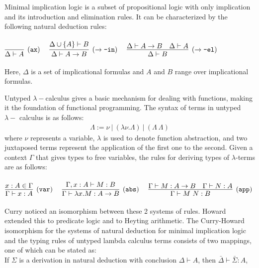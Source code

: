 \documentclass{article}
\begin{document}
	Minimal implication logic is a subset
	of propositional logic with only 
	implication and its introduction 
	and elimination rules. It can be 
	characterized by the following 
	natural deduction rules:\\ \\
	\begin{math}
		\infer[(\texttt{ax})]{\Delta \vdash A}{}
		\ \ \ \ 
		\infer[(\to\texttt{-in})]{\Delta \vdash A \to B}
		{\Delta \cup \{A\} \vdash B}
		\ \ \ \ 
		\infer[(\to\texttt{-el})]{\Delta \vdash B}
		{\Delta \vdash A \to B & \Delta \vdash A}
	\end{math} 
	\\ \\
	Here, $\Delta$ is a set of implicational 
	formulas and $A$ and $B$ range over 
	implicational formulas. 
	
	Untyped $\lambda-$calculus gives a basic 
	mechanism for dealing with functions, making 
	it the foundation of functional programming.
	The syntax of terms in untyped $\lambda-$
	calculus is as follows:
	\begin{align*}
		\Lambda := \nu\ |\ (\lambda \nu.\Lambda)
		\ |\ (\Lambda\ \Lambda)
	\end{align*}  
	where $\nu$ represents a variable, $\lambda$ 
	is used to denote function abstraction, 
	and two juxtaposed terms represent the 
	application of the first one to the second.
	Given a context $\Gamma$ that gives types 
	to free variables, the rules for deriving 
	types of $\lambda$-terms are as follows: \\ \\
	\begin{math}
		\infer[(\texttt{var})]{\Gamma \vdash x : A}
		{x : A \in \Gamma}
		\ \ \ \ 
		\infer[(\texttt{abs})]
		{\Gamma \vdash \lambda x. M : A \to B}
		{\Gamma, x : A \vdash M : B}
		\ \ \ \ 
		\infer[(\texttt{app})]{\Gamma \vdash M\ N : B}
		{\Gamma \vdash M : A \to B & \Gamma \vdash N : A}
	\end{math} 
	\\ \\
	Curry noticed an isomorphism between these 
	2 systems of rules. Howard extended this to 
	predicate logic and to Heyting arithmetic. 
	The Curry-Howard isomorphism for the systems 
	of natural deduction for minimal implication 
	logic and the typing rules of untyped lambda 
	calculus terms consists of two mappings,
	one of which can be stated as:\\

	\noindent If $\Sigma$ is a derivation in natural 
	deduction with conclusion $\Delta \vdash A$,
	then $\bar{\Delta} \vdash \bar{\Sigma} : A$,\\
	
\end{document}

